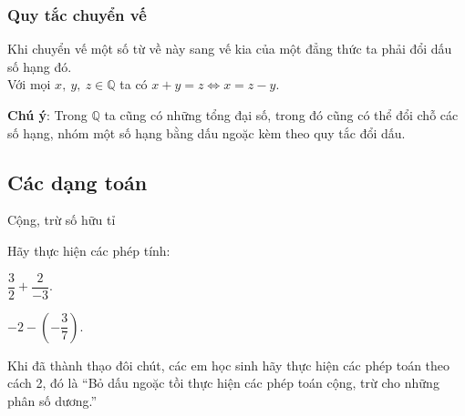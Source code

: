 \subsubsection{Quy tắc chuyển vế}
Khi chuyển vế một số từ về này sang vế kia của một đẳng thức ta phải đổi dấu số hạng đó.\\
Với mọi $x,\ y,\ z\in\mathbb{Q}$ ta có $x+y=z\Leftrightarrow x=z-y$.
\begin{note}{\textbf{Chú ý}}: Trong $\mathbb{Q}$ ta cũng có những tổng đại số, trong đó cũng có thể đổi chỗ các số hạng, nhóm một số hạng bằng dấu ngoặc kèm theo quy tắc đổi dấu.
\end{note}
\subsection{Các dạng toán}
\begin{dang}{Cộng, trừ số hữu tỉ}
\end{dang}

\begin{vd}%
	Hãy thực hiện các phép tính:
	\begin{enumEX}{2}
	\item $\dfrac{3}{2}+\dfrac{2}{-3}$.
	\item $-2-\left(-\dfrac{3}{7}\right)$.
\end{enumEX}	
\end{vd}

\begin{nx}
Khi đã thành thạo đôi chút, các em học sinh hãy thực hiện các phép toán theo cách 2, đó là ``Bỏ dấu ngoặc tồi thực hiện các phép toán cộng, trừ cho những phân số dương.''
\end{nx}


